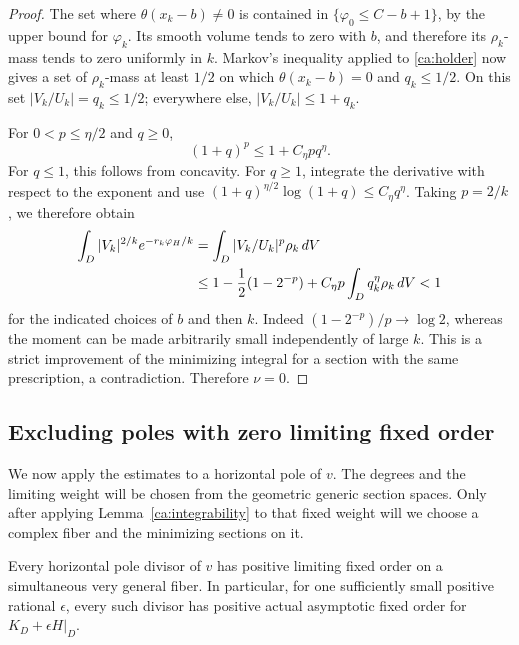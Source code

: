 \begin{proof}
The set where \(\theta(x_k-b)\ne0\) is contained in
\(\{\varphi_0\leq C-b+1\}\), by the upper bound for
\(\varphi_k\).  Its smooth volume tends to zero with \(b\),
and therefore its \(\rho_k\)-mass tends to zero uniformly in
\(k\).  Markov's inequality applied to
\eqref{ca:holder} now gives a set of \(\rho_k\)-mass at least
\(1/2\) on which \(\theta(x_k-b)=0\) and \(q_k\leq1/2\).
On this set \(|V_k/U_k|=q_k\leq1/2\); everywhere else,
\(|V_k/U_k|\leq1+q_k\).

For \(0<p\leq\eta/2\) and \(q\geq0\),
\begin{equation}\label{ca:small-exponent}
 (1+q)^p\leq1+C_\eta p q^\eta.
\end{equation}
For \(q\leq1\), this follows from concavity.  For \(q\geq1\),
integrate the derivative with respect to the exponent and use
\((1+q)^{\eta/2}\log(1+q)\leq C_\eta q^\eta\).
Taking \(p=2/k\), we therefore obtain
\begin{align}
 \int_D |V_k|^{2/k}e^{-r_k\varphi_H/k}
 &=\int_D |V_k/U_k|^p\rho_k\,dV\notag\\
 &\leq1-\frac12(1-2^{-p})
             +C_\eta p\int_D q_k^\eta\rho_k\,dV<1
                                                        \label{ca:strict-gain}
\end{align}
for the indicated choices of \(b\) and then \(k\).
Indeed \((1-2^{-p})/p\to\log2\), whereas the moment can be
made arbitrarily small independently of large \(k\).
This is a strict improvement of the minimizing integral for a
section with the same prescription, a contradiction.  Therefore
\(\nu=0\).
\end{proof}

\subsection{Excluding poles with zero limiting fixed order}

We now apply the estimates to a horizontal pole of $v$.
The degrees and the limiting weight will be chosen from the
geometric generic section spaces. Only after applying
Lemma~\ref{ca:integrability} to that fixed weight will we choose
a complex fiber and the minimizing sections on it.

\begin{proposition}\label{ca:poles}
Every horizontal pole divisor of \(v\) has positive limiting fixed
order on a simultaneous very general fiber.  In particular, for
one sufficiently small positive rational \(\epsilon\), every such
divisor has positive actual asymptotic fixed order for
\(K_D+\epsilon H|_D\).
\end{proposition}

